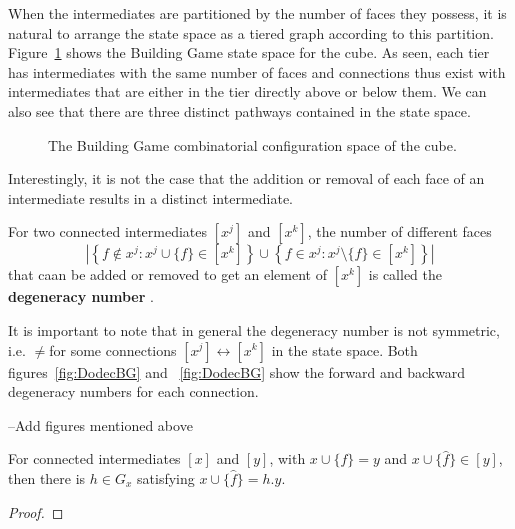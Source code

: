 When the intermediates are partitioned by the number of faces they possess, it is natural to arrange the state space as a tiered graph according to this partition. Figure~\ref{fig:CubeSS} shows the Building Game state space for the cube. As seen, each tier has intermediates with the same number of faces and connections thus exist with intermediates that are either in the tier directly above or below them. We can also see that there are three distinct pathways contained in the state space. 

\begin{figure}[ht]
\caption{The Building Game combinatorial configuration space of the cube.}
\label{fig:CubeSS}    
\end{figure}

Interestingly, it is not the case that the addition or removal of each face of an intermediate results in a distinct intermediate. 
\begin{mydef}
For two connected intermediates $[x^j]$ and $[x^k]$, the number of different faces $$\left|\left\{f \notin x^j : x^j\cup\{f\} \in [x^k]\right\}\cup\left\{f \in x^j : x^j\setminus\{f\} \in [x^k]\right\} \right|$$ that caan be added or removed to get an element of $[x^k]$  is called the \textbf{degeneracy number} \Sjk.
\end{mydef}

It is important to note that in general the degeneracy number is not symmetric, i.e. \Sjk$\neq$\Skj\spc for some connections $[x^j] \leftrightarrow [x^k]$ in the state space. Both figures~\ref{fig:DodecBG} and ~\ref{fig:DodecBG} show the forward and backward degeneracy numbers for each connection.

--Add figures mentioned above


\begin{mylem}
For connected intermediates $[x]$ and $[y]$, with $x \cup \{f\} = y$ and $x \cup \{\hat{f}\} \in [y]$, then there is $h \in G_x$ satisfying $x \cup \{\hat{f}\} = h.y$.
\end{mylem}
\begin{proof}
\end{proof}

